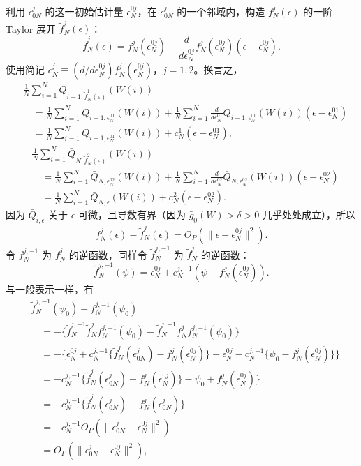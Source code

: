 利用 $\epsilon_{0N}^j$ 的这一初始估计量 $\epsilon_N^{0j}$，在 $\epsilon_{0N}^j$ 的一个邻域内，构造 $f_N^j(\epsilon)$ 的一阶 Taylor 展开 $\tilde f_N^j(\epsilon)$：
\[
 \tilde f_N^j(\epsilon)=f_N^j(\epsilon_N^{0j})
 +\frac d{d\epsilon_N^{0j}}f_N^j(\epsilon_N^{0j})(\epsilon-\epsilon_N^{0j}).
\]
使用简记 $c_N^j\equiv({d}/{d\epsilon_N^{0j}})f_N^j(\epsilon_N^{0j})$，$j=1,2$。换言之，
\[
\begin{aligned}
 &\frac1N\sum_{i=1}^N\bar Q_{i-1,\tilde f_N^1(\epsilon)}(W(i))\\
 &\quad=\frac1N\sum_{i=1}^N\bar Q_{i-1,\epsilon_N^{01}}(W(i))
 +\frac1N\sum_{i=1}^N\frac d{d\epsilon_N^{01}}
 \bar Q_{i-1,\epsilon_N^{01}}(W(i))(\epsilon-\epsilon_N^{01})\\
 &\quad=\frac1N\sum_{i=1}^N\bar Q_{i-1,\epsilon_N^{01}}(W(i))
 +c_N^1(\epsilon-\epsilon_N^{01}),
\end{aligned}
\]
\[
\begin{aligned}
 &\frac1N\sum_{i=1}^N\bar Q_{N,\tilde f_N^2(\epsilon)}(W(i))\\
 &\quad=\frac1N\sum_{i=1}^N\bar Q_{N,\epsilon_N^{02}}(W(i))
 +\frac1N\sum_{i=1}^N\frac d{d\epsilon_N^{02}}
 \bar Q_{N,\epsilon_N^{02}}(W(i))(\epsilon-\epsilon_N^{02})\\
 &\quad=\frac1N\sum_{i=1}^N\bar Q_{N,\epsilon}(W(i))+c_N^2(\epsilon-\epsilon_N^{02}).
\end{aligned}
\]
因为 $\bar Q_{i,\epsilon}$ 关于 $\epsilon$ 可微，且导数有界（因为 $\bar g_0(W)>\delta>0$ 几乎处处成立），所以
\[
 f_N^j(\epsilon)-\tilde f_N^j(\epsilon)=O_P(\|\epsilon-\epsilon_N^{0j}\|^2).
\]
令 $f_N^{j,-1}$ 为 $f_N^j$ 的逆函数，同样令 $\tilde f_N^{j,-1}$ 为 $\tilde f_N^j$ 的逆函数：
\[
 \tilde f_N^{j,-1}(\psi)=\epsilon_N^{0j}
 +c_N^{j,-1}(\psi-f_N^j(\epsilon_N^{0j})).
\]
与一般表示一样，有
\[
\begin{aligned}
 &\tilde f_N^{j,-1}(\psi_0)-f_N^{j,-1}(\psi_0)\\
 &\quad=-\{\tilde f_N^{j,-1}\tilde f_N^j f_N^{j,-1}(\psi_0)
 -\tilde f_N^{j,-1}f_N^j f_N^{j,-1}(\psi_0)\}\\
 &\quad=-\{\epsilon_N^{0j}+c_N^{j,-1}
 \{\tilde f_N^j(\epsilon_{0N}^j)-f_N^j(\epsilon_N^{0j})\}
 -\epsilon_N^{0j}-c_N^{j,-1}\{\psi_0-f_N^j(\epsilon_N^{0j})\}\}\\
 &\quad=-c_N^{j,-1}\{\tilde f_N^j(\epsilon_{0N}^j)-f_N^j(\epsilon_N^{0j})\}
 -\psi_0+f_N^j(\epsilon_N^{0j})\rbrace\\
 &\quad=-c_N^{j,-1}\{\tilde f_N^j(\epsilon_{0N}^j)-f_N^j(\epsilon_{0N}^j)\}\\
 &\quad=-c_N^{j,-1}O_P(\|\epsilon_{0N}^j-\epsilon_N^{0j}\|^2)\\
 &\quad=O_P(\|\epsilon_{0N}^j-\epsilon_N^{0j}\|^2),
\end{aligned}
\]
